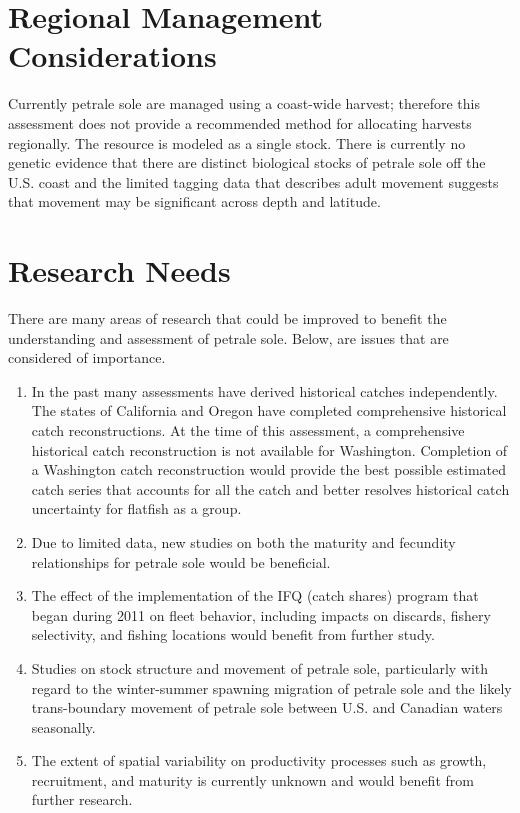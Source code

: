 \documentclass[12pt,]{article}
\begin{document}
\section{Regional Management
Considerations}\label{regional-management-considerations}

Currently petrale sole are managed using a coast-wide harvest; therefore
this assessment does not provide a recommended method for allocating
harvests regionally. The resource is modeled as a single stock. There is
currently no genetic evidence that there are distinct biological stocks
of petrale sole off the U.S. coast and the limited tagging data that
describes adult movement suggests that movement may be significant
across depth and latitude.

\section{Research Needs}\label{research-needs}

There are many areas of research that could be improved to benefit the
understanding and assessment of petrale sole. Below, are issues that are
considered of importance.

\begin{enumerate}

\item In the past many assessments have derived historical catches independently. The states of California and Oregon have completed comprehensive historical catch reconstructions. At the time of this assessment, a comprehensive historical catch reconstruction is not available for Washington. Completion of a Washington catch reconstruction would provide the best possible estimated catch series that accounts for all the catch and better resolves historical catch uncertainty for flatfish as a group. 

\item Due to limited data, new studies on both the maturity and fecundity relationships for petrale sole would be beneficial.

\item The effect of the implementation of the IFQ (catch shares) program that began during 2011 on fleet behavior, including impacts on discards, fishery selectivity, and fishing locations would benefit from further study.

\item Studies on stock structure and movement of petrale sole, particularly with regard to the winter-summer spawning migration of petrale sole and the likely trans-boundary movement of petrale sole between U.S. and Canadian waters seasonally.

\item The extent of spatial variability on productivity processes such as growth, recruitment, and maturity is currently unknown and would benefit from further research.

\end{enumerate}
\end{document}
